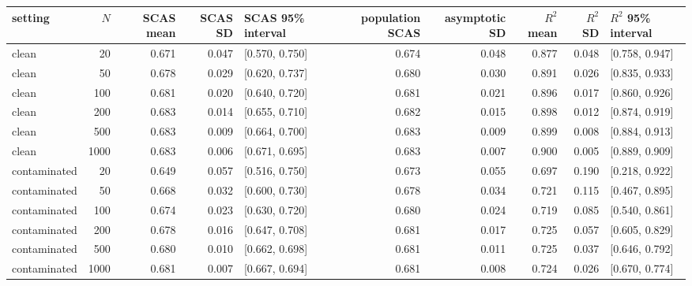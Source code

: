 \begin{tabular}{lrrrlrrrrl}
\toprule
setting & $N$ & SCAS mean & SCAS SD & SCAS 95\% interval & population SCAS & asymptotic SD & $R^2$ mean & $R^2$ SD & $R^2$ 95\% interval \\
\midrule
clean & 20 & 0.671 & 0.047 & [0.570, 0.750] & 0.674 & 0.048 & 0.877 & 0.048 & [0.758, 0.947] \\
clean & 50 & 0.678 & 0.029 & [0.620, 0.737] & 0.680 & 0.030 & 0.891 & 0.026 & [0.835, 0.933] \\
clean & 100 & 0.681 & 0.020 & [0.640, 0.720] & 0.681 & 0.021 & 0.896 & 0.017 & [0.860, 0.926] \\
clean & 200 & 0.683 & 0.014 & [0.655, 0.710] & 0.682 & 0.015 & 0.898 & 0.012 & [0.874, 0.919] \\
clean & 500 & 0.683 & 0.009 & [0.664, 0.700] & 0.683 & 0.009 & 0.899 & 0.008 & [0.884, 0.913] \\
clean & 1000 & 0.683 & 0.006 & [0.671, 0.695] & 0.683 & 0.007 & 0.900 & 0.005 & [0.889, 0.909] \\
contaminated & 20 & 0.649 & 0.057 & [0.516, 0.750] & 0.673 & 0.055 & 0.697 & 0.190 & [0.218, 0.922] \\
contaminated & 50 & 0.668 & 0.032 & [0.600, 0.730] & 0.678 & 0.034 & 0.721 & 0.115 & [0.467, 0.895] \\
contaminated & 100 & 0.674 & 0.023 & [0.630, 0.720] & 0.680 & 0.024 & 0.719 & 0.085 & [0.540, 0.861] \\
contaminated & 200 & 0.678 & 0.016 & [0.647, 0.708] & 0.681 & 0.017 & 0.725 & 0.057 & [0.605, 0.829] \\
contaminated & 500 & 0.680 & 0.010 & [0.662, 0.698] & 0.681 & 0.011 & 0.725 & 0.037 & [0.646, 0.792] \\
contaminated & 1000 & 0.681 & 0.007 & [0.667, 0.694] & 0.681 & 0.008 & 0.724 & 0.026 & [0.670, 0.774] \\
\bottomrule
\end{tabular}

